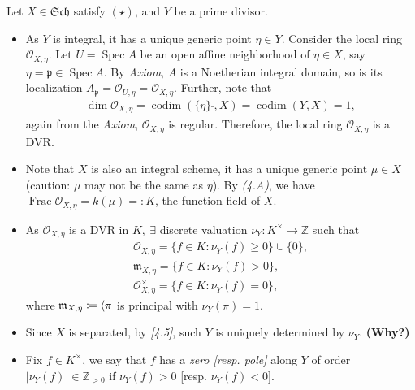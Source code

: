 \documentclass[11pt,a4paper,footinclude=true,headinclude=true]{scrbook} %
\DeclareMathOperator{\Spec}{Spec}
\DeclareMathOperator{\Frac}{Frac}
\DeclareMathOperator{\codim}{codim}
\newcommand{\OO}{\mathcal{O}}
\newcommand{\pp}{\mathfrak{p}}
\newcommand{\mm}{\mathfrak{m}}
\newcommand{\Sch}{\mathfrak{Sch}}
\newcommand{\<}{\langle}
\let\>\relax
\newcommand{\>}{\rangle}
\newenvironment{remark*}[2][Remark]
    { \begin{mdframed}[backgroundcolor=gray!20] \textbf{#1.}\ }
    {  \end{mdframed}}
\begin{document}
\begin{remark*}{}
    Let $X\in\Sch$ satisfy $(\star)$, and $Y$ be a prime divisor.
    \begin{itemize}
        \item As $Y$ is integral, it has a unique generic point $\eta\in Y$. Consider the local ring $\OO_{X,\eta}$. Let $U=\Spec A$ be an open affine neighborhood of $\eta\in X$, say $\eta=\pp\in\Spec A$. By \textit{Axiom}, $A$ is a Noetherian integral domain, so is its localization $A_\pp=\OO_{U,\eta}=\OO_{X,\eta}$. Further, note that 
        \begin{align*}
            \dim\OO_{X,\eta}=\codim(\{\eta\}\bar{},X)=\codim(Y,X)=1,
        \end{align*}
        again from the \textit{Axiom}, $\OO_{X,\eta}$ is regular. Therefore, the local ring $\OO_{X,\eta}$ is a DVR.
        \item Note that $X$ is also an integral scheme, it has a unique generic point $\mu\in X$ (caution: $\mu$ may not be the same as $\eta$). By \textit{(4.A)}, we have $\Frac\OO_{X,\eta}=k(\mu)=:K$, the function field of $X$.
        \item As $\OO_{X,\eta}$ is a DVR in $K,\ \exists$ discrete valuation $\nu_Y:K^\times\to\mathbb{Z}$ such that 
        \begin{gather*}
            \OO_{X,\eta}=\{f\in K:\nu_Y(f)\geq0\}\cup\{0\},\\
            \mm_{X,\eta}=\{f\in K:\nu_Y(f)>0\},\\
            \OO_{X,\eta}^\times=\{f\in K:\nu_Y(f)=0\},
        \end{gather*}
        where $\mm_{X,\eta}\coloneqq\<\pi\>$ is principal with $\nu_Y(\pi)=1$.
        \item Since $X$ is separated, by \textit{[4.5]}, such $Y$ is uniquely determined by $\nu_Y$. \textbf{(Why?)}
        \item Fix $f\in K^\times$, we say that $f$ has a \textit{zero [resp. pole]} along $Y$ of order $|\nu_Y(f)|\in\mathbb{Z}_{>0}$ if $\nu_Y(f)>0$ [resp. $\nu_Y(f)<0$].
    \end{itemize}
\end{remark*}
\end{document}
